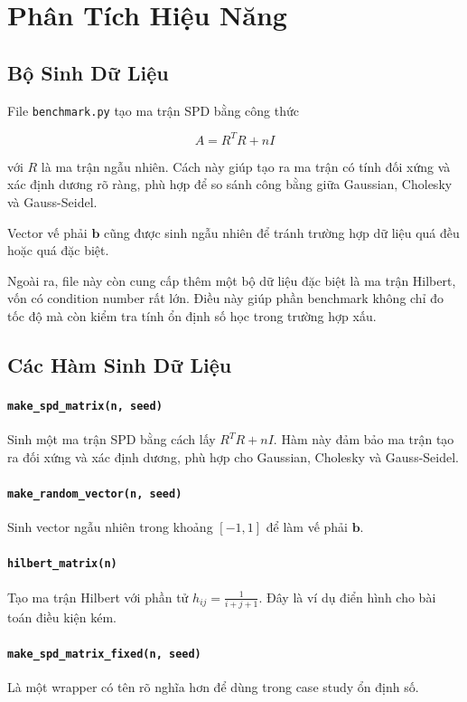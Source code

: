 \documentclass[12pt, a4paper, twoside]{article}
\begin{document}
\section{Phân Tích Hiệu Năng}

\subsection{Bộ Sinh Dữ Liệu}

File \texttt{benchmark.py} tạo ma trận SPD bằng công thức

\[
A = R^T R + nI
\]

với $R$ là ma trận ngẫu nhiên. Cách này giúp tạo ra ma trận có tính đối xứng và xác định dương rõ ràng, phù hợp để so sánh công bằng giữa Gaussian, Cholesky và Gauss-Seidel.

Vector vế phải $\mathbf{b}$ cũng được sinh ngẫu nhiên để tránh trường hợp dữ liệu quá đều hoặc quá đặc biệt.

Ngoài ra, file này còn cung cấp thêm một bộ dữ liệu đặc biệt là ma trận Hilbert, vốn có condition number rất lớn. Điều này giúp phần benchmark không chỉ đo tốc độ mà còn kiểm tra tính ổn định số học trong trường hợp xấu.

\subsection{Các Hàm Sinh Dữ Liệu}

\paragraph{\texttt{make\_spd\_matrix(n, seed)}}
Sinh một ma trận SPD bằng cách lấy $R^TR + nI$. Hàm này đảm bảo ma trận tạo ra đối xứng và xác định dương, phù hợp cho Gaussian, Cholesky và Gauss-Seidel.

\paragraph{\texttt{make\_random\_vector(n, seed)}}
Sinh vector ngẫu nhiên trong khoảng $[-1, 1]$ để làm vế phải $\mathbf{b}$.

\paragraph{\texttt{hilbert\_matrix(n)}}
Tạo ma trận Hilbert với phần tử $h_{ij} = \frac{1}{i+j+1}$. Đây là ví dụ điển hình cho bài toán điều kiện kém.

\paragraph{\texttt{make\_spd\_matrix\_fixed(n, seed)}}
Là một wrapper có tên rõ nghĩa hơn để dùng trong case study ổn định số.
\end{document}
